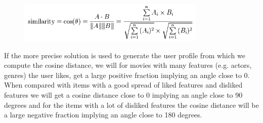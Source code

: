 \begin{figure}[H]
\centering
\includegraphics[width=0.8\textwidth]{Images/Cosine simularity.png}
\caption{}
\label{Cosine}
\end{figure}

If the more precise solution is used to generate the user profile from which we compute the cosine distance, we will for movies with many features (e.g. actors, genres) the user likes, get a large positive fraction implying an angle close to 0. When compared with items with a good spread of liked features and disliked features we will get a cosine distance close to 0 implying an angle close to 90 degrees and for the items with a lot of disliked features the cosine distance will be a large negative fraction implying an angle close to 180 degrees.


